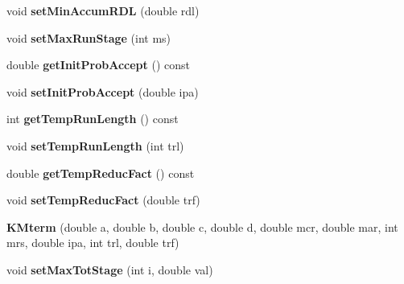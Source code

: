 \begin{DoxyCompactItemize}
\item 
\hypertarget{class_k_mterm_a9401f5aa3fe9b384fb5fc0d45fe0e06a}{
void {\bfseries setMinAccumRDL} (double rdl)}
\label{class_k_mterm_a9401f5aa3fe9b384fb5fc0d45fe0e06a}

\item 
\hypertarget{class_k_mterm_a6ff57f58b1e7227d32182a998ec735da}{
void {\bfseries setMaxRunStage} (int ms)}
\label{class_k_mterm_a6ff57f58b1e7227d32182a998ec735da}

\item 
\hypertarget{class_k_mterm_a7153bc033271d8a1864a79a66cf6f222}{
double {\bfseries getInitProbAccept} () const }
\label{class_k_mterm_a7153bc033271d8a1864a79a66cf6f222}

\item 
\hypertarget{class_k_mterm_acfd5067d49d00e7d1dab7562b37e9ad8}{
void {\bfseries setInitProbAccept} (double ipa)}
\label{class_k_mterm_acfd5067d49d00e7d1dab7562b37e9ad8}

\item 
\hypertarget{class_k_mterm_a0a1ee7f49e6d91e1059e873a3e6641c9}{
int {\bfseries getTempRunLength} () const }
\label{class_k_mterm_a0a1ee7f49e6d91e1059e873a3e6641c9}

\item 
\hypertarget{class_k_mterm_a1315f56a8a6e1a4afd418102f5066dc9}{
void {\bfseries setTempRunLength} (int trl)}
\label{class_k_mterm_a1315f56a8a6e1a4afd418102f5066dc9}

\item 
\hypertarget{class_k_mterm_a848dc310ab1f5bdcb1ede56409893e7e}{
double {\bfseries getTempReducFact} () const }
\label{class_k_mterm_a848dc310ab1f5bdcb1ede56409893e7e}

\item 
\hypertarget{class_k_mterm_a00156667d37450e2936e83d03f3e5f86}{
void {\bfseries setTempReducFact} (double trf)}
\label{class_k_mterm_a00156667d37450e2936e83d03f3e5f86}

\item 
\hypertarget{class_k_mterm_a228e731c6dba88785c4fb3d1ed8db367}{
{\bfseries KMterm} (double a, double b, double c, double d, double mcr, double mar, int mrs, double ipa, int trl, double trf)}
\label{class_k_mterm_a228e731c6dba88785c4fb3d1ed8db367}

\item 
\hypertarget{class_k_mterm_aeae2458189453d674030daff53a7046e}{
void {\bfseries setMaxTotStage} (int i, double val)}
\label{class_k_mterm_aeae2458189453d674030daff53a7046e}


\end{DoxyCompactItemize}
